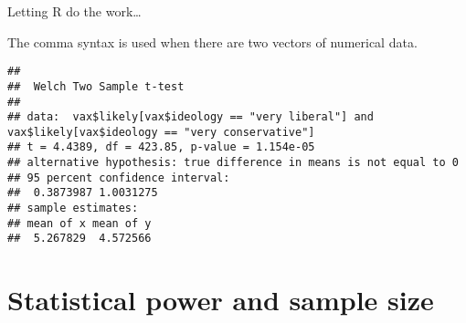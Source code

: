 \documentclass[
  ignorenonframetext,
  aspectratio=169]{beamer}
\newenvironment{Shaded}{\begin{snugshade}}{\end{snugshade}}
\newcommand{\CommentTok}[1]{\textcolor[rgb]{0.56,0.35,0.01}{\textit{#1}}}
\newcommand{\FunctionTok}[1]{\textcolor[rgb]{0.13,0.29,0.53}{\textbf{#1}}}
\newcommand{\NormalTok}[1]{#1}
\newcommand{\SpecialCharTok}[1]{\textcolor[rgb]{0.81,0.36,0.00}{\textbf{#1}}}
\newcommand{\StringTok}[1]{\textcolor[rgb]{0.31,0.60,0.02}{#1}}
\begin{document}
\begin{frame}[fragile]{Letting R do the work\ldots{}}
\protect\hypertarget{letting-r-do-the-work-1}{}
\small

The comma syntax is used when there are two vectors of numerical data.

\vspace{0.3cm}

\scriptsize

\begin{Shaded}
\end{Shaded}

\begin{verbatim}
## 
##  Welch Two Sample t-test
## 
## data:  vax$likely[vax$ideology == "very liberal"] and vax$likely[vax$ideology == "very conservative"]
## t = 4.4389, df = 423.85, p-value = 1.154e-05
## alternative hypothesis: true difference in means is not equal to 0
## 95 percent confidence interval:
##  0.3873987 1.0031275
## sample estimates:
## mean of x mean of y 
##  5.267829  4.572566
\end{verbatim}
\end{frame}

\hypertarget{statistical-power-and-sample-size}{%
\section{Statistical power and sample
size}\label{statistical-power-and-sample-size}}
\end{document}
